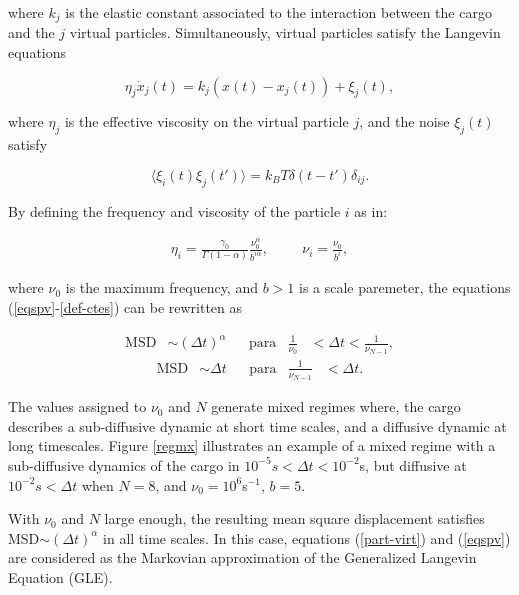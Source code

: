 \documentclass{article}
\begin{document}
where $k_j$ is the elastic constant associated to the interaction between the cargo and the $j$ virtual particles. Simultaneously, virtual particles satisfy the Langevin equations

\begin{equation}\label{eqspv}
\eta_j\dot{x}_j(t)=k_j(x(t)-x_j(t))+\xi_j(t),
\end{equation}

where $\eta_j$ is the effective viscosity on the virtual particle $j$, and the noise $\xi_j(t)$ satisfy

\begin{equation}\label{fluc-disp2}
\langle\xi_i(t) \xi_j(t')\rangle=k_BT\delta(t-t')\delta_{ij}.
\end{equation}

By defining the frequency and viscosity of the particle $i$ as in:

\begin{gather}\label{def-ctes}
\eta_i=\frac{\gamma_0}{\Gamma(1-\alpha)}\frac{\nu_0^\alpha}{b^{i\alpha}},\hspace{1cm}\nu_i=\frac{\nu_0}{b^i},
\end{gather}

where $\nu_0$ is the maximum frequency, and $b>1$ is a scale paremeter, the equations (\ref{eqspv}-\ref{def-ctes}) can be rewritten as

\begin{align}\label{nu1}
\text{MSD}&\sim(\Delta t)^\alpha  &  &\text{para} & \frac{1}{\nu_0}&<\Delta t<\frac{1}{\nu_{N-1}},
\end{align}
\begin{align}\label{nu2}
\text{MSD}&\sim\Delta t & &\text{para} & \frac{1}{\nu_{N-1}}&<\Delta t.
\end{align}

The values assigned to $\nu_0$ and $N$ generate mixed regimes where, the cargo describes a sub-diffusive dynamic at short time scales, and a diffusive dynamic at long timescales. Figure \ref{regmx} illustrates an example of a mixed regime with a sub-diffusive dynamics of the cargo in $10^{-5}s<\Delta t<10^{-2}$s, but diffusive at $10^{-2}s<\Delta t$ when $N=8$, and $\nu_0=10^{6}$s$^{-1}$, $b=5$.

With $\nu_0$ and $N$ large enough, the resulting mean square displacement satisfies MSD$\sim(\Delta t)^\alpha$ in all time scales. In this case, equations (\ref{part-virt}) and (\ref{eqspv}) are considered as the Markovian approximation of the Generalized Langevin Equation (GLE).
\end{document}
